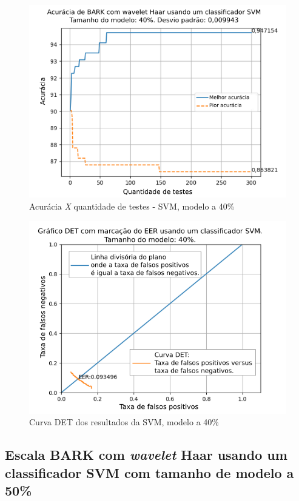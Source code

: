 			\begin{figure}[ht]
				\centering
				\includegraphics[width=.95\linewidth]{images/results/confusionMatrices/classifier_SVM_40.png}
				\caption{Acurácia \textit{X} quantidade de testes - SVM, modelo a 40\%}
				\label{fig:classifiersvm40}
			\end{figure}
		
			\begin{figure}[!h]
				\centering
				\includegraphics[width=.9\linewidth]{images/results/det/DET_SVM_40}
				\caption{Curva DET dos resultados da SVM, modelo a 40\%}
				\label{fig:detsvm40}
			\end{figure}

			\FloatBarrier

		\subsection{Escala BARK com \textit{wavelet} Haar usando um classificador SVM com tamanho de modelo a 50\%}


